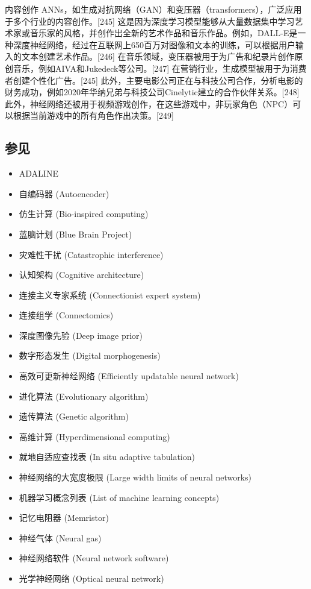 内容创作  
ANNs，如生成对抗网络（GAN）和变压器（transformers），广泛应用于多个行业的内容创作。[245] 这是因为深度学习模型能够从大量数据集中学习艺术家或音乐家的风格，并创作出全新的艺术作品和音乐作品。例如，DALL-E是一种深度神经网络，经过在互联网上650百万对图像和文本的训练，可以根据用户输入的文本创建艺术作品。[246] 在音乐领域，变压器被用于为广告和纪录片创作原创音乐，例如AIVA和Jukedeck等公司。[247] 在营销行业，生成模型被用于为消费者创建个性化广告。[245] 此外，主要电影公司正在与科技公司合作，分析电影的财务成功，例如2020年华纳兄弟与科技公司Cinelytic建立的合作伙伴关系。[248] 此外，神经网络还被用于视频游戏创作，在这些游戏中，非玩家角色（NPC）可以根据当前游戏中的所有角色作出决策。[249]
\subsection{参见}
\begin{itemize}
\item ADALINE  
\item 自编码器 (Autoencoder)  
\item 仿生计算 (Bio-inspired computing)  
\item 蓝脑计划 (Blue Brain Project)  
\item 灾难性干扰 (Catastrophic interference)  
\item 认知架构 (Cognitive architecture)  
\item 连接主义专家系统 (Connectionist expert system)  
\item 连接组学 (Connectomics)  
\item 深度图像先验 (Deep image prior)  
\item 数字形态发生 (Digital morphogenesis)  
\item 高效可更新神经网络 (Efficiently updatable neural network)  
\item 进化算法 (Evolutionary algorithm)  
\item 遗传算法 (Genetic algorithm)  
\item 高维计算 (Hyperdimensional computing)  
\item 就地自适应查找表 (In situ adaptive tabulation)  
\item 神经网络的大宽度极限 (Large width limits of neural networks)  
\item 机器学习概念列表 (List of machine learning concepts)  
\item 记忆电阻器 (Memristor)  
\item 神经气体 (Neural gas)  
\item 神经网络软件 (Neural network software)  
\item 光学神经网络 (Optical neural network)  

\end{itemize}

